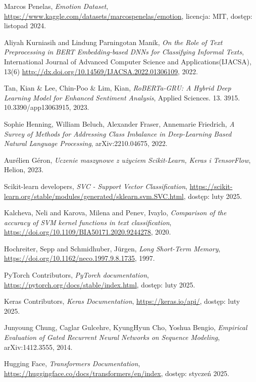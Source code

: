 Marcos Penelas,  
\textit{Emotion Dataset},  
\url{https://www.kaggle.com/datasets/marcospenelas/emotion}, licencja: MIT, dostęp: listopad 2024.

Aliyah Kurniasih and Lindung Parningotan Manik,
\textit{On the Role of Text Preprocessing in BERT Embedding-based DNNs for Classifying Informal Texts},
International Journal of Advanced Computer Science and Applications(IJACSA), 13(6)
\url{http://dx.doi.org/10.14569/IJACSA.2022.01306109}, 2022.

Tan, Kian \& Lee, Chin-Poo \& Lim, Kian,
\textit{RoBERTa-GRU: A Hybrid Deep Learning Model for Enhanced Sentiment Analysis},
Applied Sciences. 13. 3915. 10.3390/app13063915, 2023.

Sophie Henning, William Beluch, Alexander Fraser, Annemarie Friedrich,
\textit{A Survey of Methods for Addressing Class Imbalance in Deep-Learning Based Natural Language Processing},
arXiv:2210.04675, 2022.

Aurélien Géron,
\textit{Uczenie maszynowe z użyciem Scikit-Learn, Keras i TensorFlow},
Helion, 2023.

Scikit-learn developers,
\textit{SVC - Support Vector Classification},
\url{https://scikit-learn.org/stable/modules/generated/sklearn.svm.SVC.html}, dostęp: luty 2025.

Kalcheva, Neli and Karova, Milena and Penev, Ivaylo,
\textit{Comparison of the accuracy of SVM kernel functions in text classification},
\url{https://doi.org/10.1109/BIA50171.2020.9244278}, 2020.

Hochreiter, Sepp and Schmidhuber, Jürgen,
\textit{Long Short-Term Memory},
\url{https://doi.org/10.1162/neco.1997.9.8.1735}, 1997.

PyTorch Contributors,
\textit{PyTorch documentation},
\url{https://pytorch.org/docs/stable/index.html}, dostęp: luty 2025.

Keras Contributors,
\textit{Keras Documentation},
\url{https://keras.io/api/}, dostęp: luty 2025.

Junyoung Chung, Caglar Gulcehre, KyungHyun Cho, Yoshua Bengio,
\textit{Empirical Evaluation of Gated Recurrent Neural Networks on Sequence Modeling},
arXiv:1412.3555, 2014.

Hugging Face,
\textit{Transformers Documentation},
\url{https://huggingface.co/docs/transformers/en/index}, dostęp: styczeń 2025.

